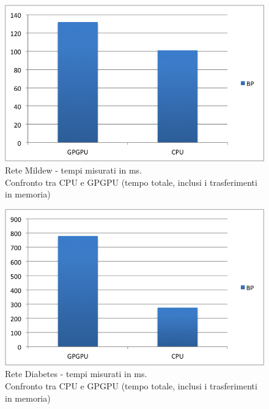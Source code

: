 \documentclass[a4paper]{article}   %
\begin{document}
\begin{figure}[p]
\centering
\includegraphics[scale=0.8]{MildewTOT.png}
\caption{Rete Mildew - tempi misurati in ms.\\Confronto tra CPU e GPGPU (tempo totale, inclusi i trasferimenti in memoria)} 
\label{graficoMildew}
\end{figure}

\begin{figure}[p]
\centering
\includegraphics[scale=0.8]{DiabetesTOT.png}
\caption{Rete Diabetes - tempi misurati in ms.\\Confronto tra CPU e GPGPU (tempo totale, inclusi i trasferimenti in memoria)} 
\label{graficoDiabetes}
\end{figure}
\end{document}
